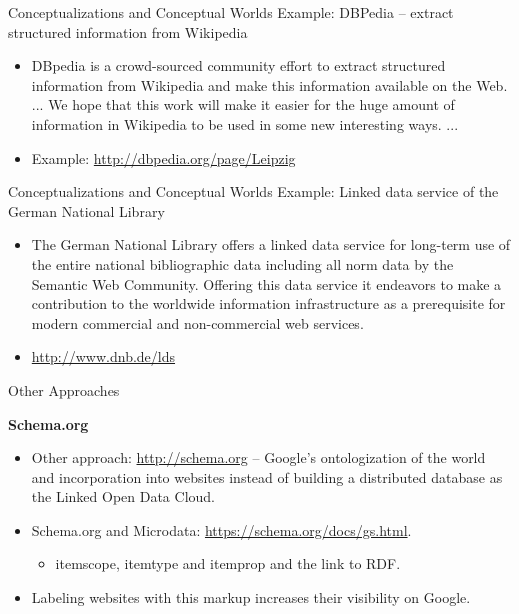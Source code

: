 \documentclass{beamer}
\newcommand{\ueberschrift}[1]{\begin{center}\bf #1\end{center}}
\begin{document}
\begin{frame}{Conceptualizations and Conceptual Worlds}
Example: DBPedia -- extract structured information from Wikipedia
\begin{itemize}
\item DBpedia is a crowd-sourced community effort to extract structured
  information from Wikipedia and make this information available on the
  Web. ... We hope that this work will make it easier for the huge amount of
  information in Wikipedia to be used in some new interesting ways. ...
\item Example: \url{http://dbpedia.org/page/Leipzig}
\end{itemize}
\end{frame}

\begin{frame}{Conceptualizations and Conceptual Worlds}
Example: Linked data service of the German National Library
\begin{itemize}
\item The German National Library offers a linked data service for long-term
  use of the entire national bibliographic data including all norm data by the
  Semantic Web Community. Offering this data service it endeavors to make a
  contribution to the worldwide information infrastructure as a prerequisite
  for modern commercial and non-commercial web services.
\item \url{http://www.dnb.de/lds}
\end{itemize}
\end{frame}

\begin{frame}{Other Approaches}
\ueberschrift{Schema.org}
\begin{itemize}
\item Other approach: \url{http://schema.org} -- Google's ontologization of
  the world and incorporation into websites instead of building a distributed
  database as the Linked Open Data Cloud.
\item Schema.org and Microdata: \url{https://schema.org/docs/gs.html}.
  \begin{itemize}
  \item itemscope, itemtype and itemprop and the link to RDF.
  \end{itemize}
\item Labeling websites with this markup increases their visibility on Google.
\end{itemize}
\end{frame}
\end{document}
